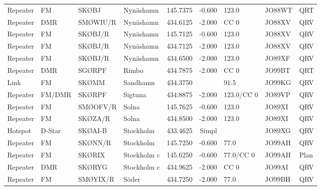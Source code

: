 \begin{landscape}
\begin{longtable}{llllrrlll}
	Repeater          & FM                 & SKØBJ    & Nynäshamn       &     145.7375 &     -0.600 & 123.0      & JO88WT      & QRT      \\
	Repeater          & DMR                & SMØWIU/R & Nynäshamn       &     434.6125 &     -2.000 & CC 0       & JO88XV      & QRV      \\
	Repeater          & FM                 & SKØBJ/R  & Nynäshamn       &     145.7125 &     -0.600 & 123.0      & JO88XV      & QRV      \\
	Repeater          & FM                 & SKØBJ/R  & Nynäshamn       &     434.7125 &     -2.000 & 123.0      & JO88XV      & QRV      \\
	Repeater          & FM                 & SKØBJ/R  & Nynäshamn       &     434.6500 &     -2.000 & 123.0      & JO89XF      & QRV      \\
	Repeater          & DMR                & SGØRPF   & Rimbo           &     434.7875 &     -2.000 & CC 0       & JO99BT      & QRT      \\
	Link              & FM                 & SKØMM    & Sandhamn        &     434.3750 &            & 91.5       & JO99KG      & QRV      \\
	Repeater          & FM/DMR             & SKØRPF   & Sigtuna         &     434.8875 &     -2.000 & 123.0/CC 0 & JO89VP      & QRV      \\
	Repeater          & FM                 & SMØOFV/R & Solna           &     145.7625 &     -0.600 & 123.0      & JO89XI      & QRV      \\
	Repeater          & FM                 & SKØZA/R  & Solna           &     434.8500 &     -2.000 & 123.0      & JO89XI      & QRV      \\
	Hotspot           & D-Star             & SKØAI-B  & Stockholm       &     433.4625 &      Simpl &            & JO89XG      & QRV      \\
	Repeater          & FM                 & SKØNN/R  & Stockholm       &     145.7250 &     -0.600 & 77.0       & JO99AH      & QRV      \\
	Repeater          & FM                 & SKØRIX   & Stockholm c     &     145.6250 &     -0.600 & 77.0/CC 0  & JO99AH      & Plan     \\
	Repeater          & DMR                & SKØRYG   & Stockholm c     &     434.9625 &     -2.000 & CC 0       & JO99AI      & QRV      \\
	Repeater          & FM                 & SMØYIX/R & Söder           &     434.7250 &     -2.000 & 77.0       & JO99BH      & QRV      \\

\end{longtable}
\end{landscape}
